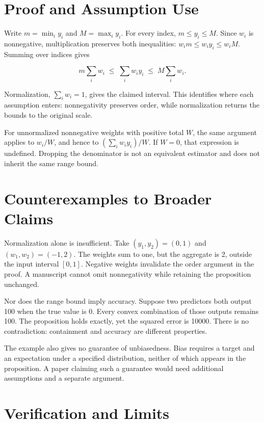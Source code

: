\documentclass[
  10pt,
  letterpaper,
]{article}
\begin{document}
\section{Proof and Assumption Use}\label{proof-and-assumption-use}

Write \(m=\min_i y_i\) and \(M=\max_i y_i\). For every index,
\(m\leq y_i\leq M\). Since \(w_i\) is nonnegative, multiplication
preserves both inequalities: \(w_i m\leq w_i y_i\leq w_i M\). Summing
over indices gives

\[
m\sum_i w_i\;\leq\;\sum_i w_i y_i\;\leq\;M\sum_i w_i.
\]

Normalization, \(\sum_i w_i=1\), gives the claimed interval. This
identifies where each assumption enters: nonnegativity preserves order,
while normalization returns the bounds to the original scale.

For unnormalized nonnegative weights with positive total \(W\), the same
argument applies to \(w_i/W\), and hence to \((\sum_i w_i y_i)/W\). If
\(W=0\), that expression is undefined. Dropping the denominator is not
an equivalent estimator and does not inherit the same range bound.

\section{Counterexamples to Broader
Claims}\label{counterexamples-to-broader-claims}

Normalization alone is insufficient. Take \((y_1,y_2)=(0,1)\) and
\((w_1,w_2)=(-1,2)\). The weights sum to one, but the aggregate is 2,
outside the input interval \([0,1]\). Negative weights invalidate the
order argument in the proof. A manuscript cannot omit nonnegativity
while retaining the proposition unchanged.

Nor does the range bound imply accuracy. Suppose two predictors both
output 100 when the true value is 0. Every convex combination of those
outputs remains 100. The proposition holds exactly, yet the squared
error is 10000. There is no contradiction: containment and accuracy are
different properties.

The example also gives no guarantee of unbiasedness. Bias requires a
target and an expectation under a specified distribution, neither of
which appears in the proposition. A paper claiming such a guarantee
would need additional assumptions and a separate argument.

\section{Verification and Limits}\label{verification-and-limits}
\end{document}
